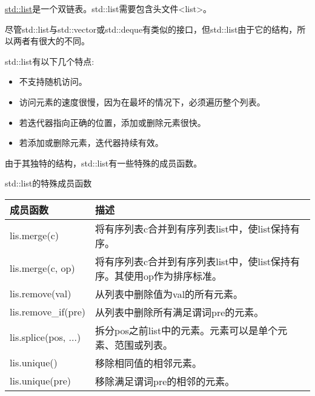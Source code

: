 

\href{http://en.cppreference.com/w/cpp/container/list}{std::list}是一个双链表。std::list需要包含头文件<list>。

尽管std::list与std::vector或std::deque有类似的接口，但std::list由于它的结构，所以两者有很大的不同。

std::list有以下几个特点:

\begin{itemize}
\item
不支持随机访问。

\item
访问元素的速度很慢，因为在最坏的情况下，必须遍历整个列表。

\item
若迭代器指向正确的位置，添加或删除元素很快。

\item
若添加或删除元素，迭代器持续有效。
\end{itemize}

由于其独特的结构，std::list有一些特殊的成员函数。

\begin{center}
std::list的特殊成员函数
\end{center}

\begin{longtable}[c]{|l|l|}
\hline
\textbf{成员函数} & \textbf{描述}                                                         \\ \hline
\endfirsthead
%
\endhead
%
lis.merge(c)              & 将有序列表c合并到有序列表list中，使list保持有序。 \\ \hline
lis.merge(c, op)     & 将有序列表c合并到有序列表list中，使list保持有序。其使用op作为排序标准。 \\ \hline
lis.remove(val)           & 从列表中删除值为val的所有元素。                                \\ \hline
lis.remove\_if(pre)       & 从列表中删除所有满足谓词pre的元素。                 \\ \hline
lis.splice(pos, ...) & 拆分pos之前list中的元素。元素可以是单个元素、范围或列表。                 \\ \hline
lis.unique()              & 移除相同值的相邻元素。                                \\ \hline
lis.unique(pre)           & 移除满足谓词pre的相邻的元素。                     \\ \hline
\end{longtable}

